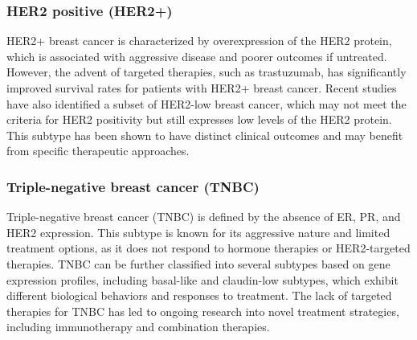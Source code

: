 \subsubsection{HER2 positive (HER2+)}
HER2+ breast cancer is characterized by overexpression of the HER2 protein,
which is associated with aggressive disease and poorer outcomes if untreated.
However, the advent of targeted therapies, such as trastuzumab, has
significantly improved survival rates for patients with HER2+ breast
cancer\supercite{modi_antitumor_2020}.
Recent studies have also identified a subset of HER2-low breast cancer, which
may not meet the criteria for HER2 positivity but still expresses low levels of
the HER2 protein.
This subtype has been shown to have distinct clinical outcomes and may benefit
from specific therapeutic
approaches\supercite{won_clinical_2022,mutai_prognostic_2021}.

\subsubsection{Triple-negative breast cancer (TNBC)}
Triple-negative breast cancer (TNBC) is defined by the absence of ER, PR, and
HER2 expression.
This subtype is known for its aggressive nature and limited treatment options,
as it does not respond to hormone therapies or HER2-targeted
therapies\supercite{sizemore_triple_2021}.
TNBC can be further classified into several subtypes based on gene expression
profiles, including basal-like and claudin-low subtypes, which exhibit
different biological behaviors and responses to
treatment\supercite{lehmann_identification_2011}.
The lack of targeted therapies for TNBC has led to ongoing research into novel
treatment strategies, including immunotherapy and combination
therapies\supercite{lehmann_identification_2011}.

